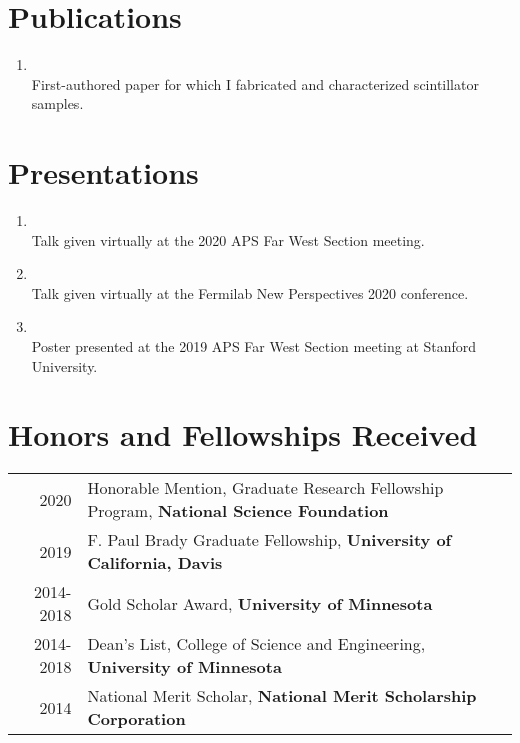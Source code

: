 \documentclass[a4paper,10pt]{article}
\newcommand{\UCD}{\textbf{University of California, Davis\xspace}}
\newcommand{\UMN}{\textbf{University of Minnesota\xspace}}
\begin{document}
\section{Publications}
\begin{enumerate}
\item {} \\
    {\footnotesize First-authored paper for which I fabricated and characterized scintillator samples.}
\end{enumerate}


\section{Presentations}
\begin{enumerate}
\item {} \\
    {\footnotesize Talk given virtually at the 2020 APS Far West Section meeting.}
\item {} \\
    {\footnotesize Talk given virtually at the Fermilab New Perspectives 2020 conference.}
\item {} \\
    {\footnotesize Poster presented at the 2019 APS Far West Section meeting at Stanford University.}
\end{enumerate}


\section{Honors and Fellowships Received}
\begin{tabular}{rl}
\textsc{2020} & Honorable Mention, Graduate Research Fellowship Program, \textbf{National Science Foundation} \\
\textsc{2019} & F. Paul Brady Graduate Fellowship, \UCD \\ %
\textsc{2014-2018} & Gold Scholar Award, \UMN \\
\textsc{2014-2018} & Dean's List, College of Science and Engineering, \UMN \\
\textsc{2014} & National Merit Scholar, \textbf{National Merit Scholarship Corporation} \\
\end{tabular}


\end{document}
